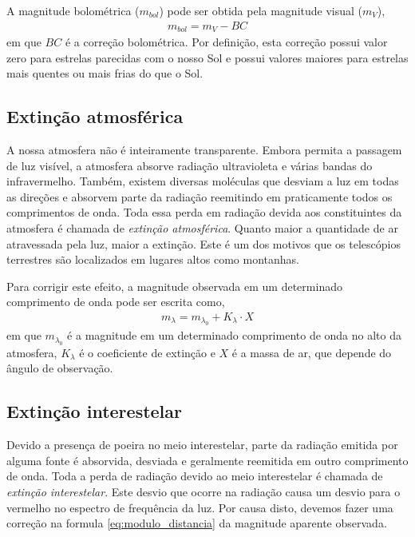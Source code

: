 A magnitude bolométrica ($m_{\si{bol}}$) pode ser obtida pela magnitude visual ($m_V$),
\begin{align}
m_{\si{bol}} = m_V - BC
\end{align}
em que $BC$ é a correção bolométrica. Por definição, esta correção possui valor zero para estrelas parecidas com o nosso Sol e possui valores maiores para estrelas mais quentes ou mais frias do que o Sol.

\subsection{Extinção atmosférica}

A nossa atmosfera não é inteiramente transparente. Embora permita a passagem de luz visível, a atmosfera absorve radiação ultravioleta e várias bandas do infravermelho. Também, existem diversas moléculas que desviam a luz em todas as direções e absorvem parte da radiação reemitindo em praticamente todos os comprimentos de onda. Toda essa perda em radiação devida aos constituintes da atmosfera é chamada de \textit{extinção atmosférica}. Quanto maior a quantidade de ar atravessada pela luz, maior a extinção. Este é um dos motivos que os telescópios terrestres são localizados em lugares altos como montanhas.

Para corrigir este efeito, a magnitude observada em um determinado comprimento de onda pode ser escrita como,
\begin{align}
m_{\lambda} = m_{\lambda_0} + K_{\lambda} \cdot X
\end{align}
em que $m_{\lambda_0}$ é a magnitude em um determinado comprimento de onda no alto da atmosfera, $K_{\lambda}$ é o coeficiente de extinção e $X$ é a massa de ar, que depende do ângulo de observação.

\subsection{Extinção interestelar}

Devido a presença de poeira no meio interestelar, parte da radiação emitida por alguma fonte é absorvida, desviada e geralmente reemitida em outro comprimento de onda. Toda a perda de radiação devido ao meio interestelar é chamada de \textit{extinção interestelar}. Este desvio que ocorre na radiação causa um desvio para o vermelho no espectro de frequência da luz. Por causa disto, devemos fazer uma correção na formula \eqref{eq:modulo_distancia} da magnitude aparente observada.

